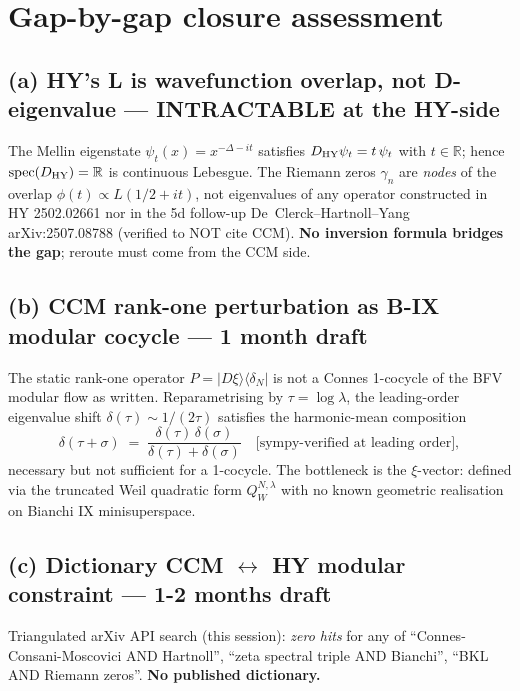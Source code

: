 \documentclass[11pt]{article}
\begin{document}
\section{Gap-by-gap closure assessment}

\subsection*{(a) HY's L is wavefunction overlap, not D-eigenvalue --- INTRACTABLE at the HY-side}
The Mellin eigenstate \(\psi_t(x)=x^{-\Delta - it}\) satisfies
\(D_{\rm HY}\psi_t = t\,\psi_t\) with \(t\in\mathbb R\); hence
\(\operatorname{spec}(D_{\rm HY})=\mathbb R\) is continuous Lebesgue.
The Riemann zeros \(\gamma_n\) are \emph{nodes} of the overlap
\(\phi(t)\propto L(1/2+it)\), not eigenvalues of any operator constructed
in HY 2502.02661 nor in the 5d follow-up
De~Clerck--Hartnoll--Yang arXiv:2507.08788 (verified to NOT cite CCM).
\textbf{No inversion formula bridges the gap}; reroute must come from
the CCM side.

\subsection*{(b) CCM rank-one perturbation as B-IX modular cocycle --- 1 month draft}
The static rank-one operator \(P=|D\xi\rangle\langle\delta_N|\) is not a
Connes 1-cocycle of the BFV modular flow as written. Reparametrising by
\(\tau=\log\lambda\), the leading-order eigenvalue shift
\(\delta(\tau)\sim 1/(2\tau)\) satisfies the harmonic-mean composition
\[
  \delta(\tau+\sigma) \;=\;
  \frac{\delta(\tau)\,\delta(\sigma)}{\delta(\tau)+\delta(\sigma)}
  \quad\text{[sympy-verified at leading order]},
\]
necessary but not sufficient for a 1-cocycle. The bottleneck is the
\(\xi\)-vector: defined via the truncated Weil quadratic form
\(Q_W^{N,\lambda}\) with no known geometric realisation on Bianchi IX
minisuperspace.

\subsection*{(c) Dictionary CCM \(\leftrightarrow\) HY modular constraint --- 1-2 months draft}
Triangulated arXiv API search (this session): \emph{zero hits} for any of
``Connes-Consani-Moscovici AND Hartnoll'', ``zeta spectral triple AND
Bianchi'', ``BKL AND Riemann zeros''. \textbf{No published dictionary.}
\end{document}
